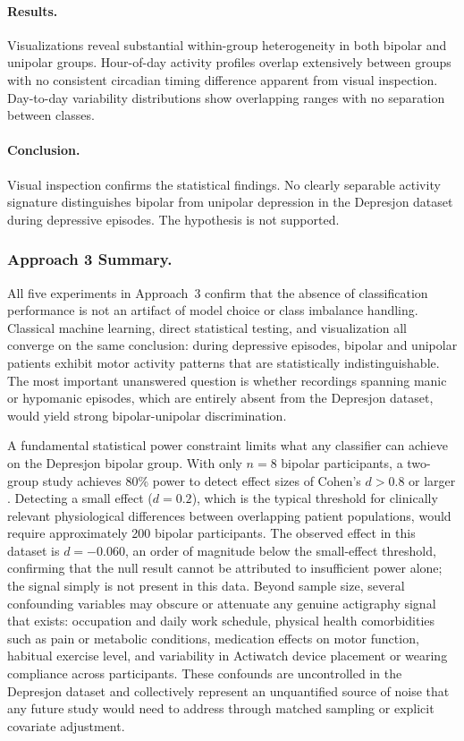 \paragraph{Results.}
Visualizations reveal substantial within-group heterogeneity in both bipolar and unipolar groups. Hour-of-day activity profiles overlap extensively between groups with no consistent circadian timing difference apparent from visual inspection. Day-to-day variability distributions show overlapping ranges with no separation between classes.

\paragraph{Conclusion.}
Visual inspection confirms the statistical findings. No clearly separable activity signature distinguishes bipolar from unipolar depression in the Depresjon dataset during depressive episodes. The hypothesis is not supported.

\subsubsection*{Approach 3 Summary.}
All five experiments in Approach~3 confirm that the absence of classification performance is not an artifact of model choice or class imbalance handling. Classical machine learning, direct statistical testing, and visualization all converge on the same conclusion: during depressive episodes, bipolar and unipolar patients exhibit motor activity patterns that are statistically indistinguishable. The most important unanswered question is whether recordings spanning manic or hypomanic episodes, which are entirely absent from the Depresjon dataset, would yield strong bipolar-unipolar discrimination.

A fundamental statistical power constraint limits what any classifier can achieve on the Depresjon bipolar group. With only $n = 8$ bipolar participants, a two-group study achieves 80\% power to detect effect sizes of Cohen's $d > 0.8$ or larger \cite{cohen1988statistical}. Detecting a small effect ($d = 0.2$), which is the typical threshold for clinically relevant physiological differences between overlapping patient populations, would require approximately 200 bipolar participants. The observed effect in this dataset is $d = {-}0.060$, an order of magnitude below the small-effect threshold, confirming that the null result cannot be attributed to insufficient power alone; the signal simply is not present in this data. Beyond sample size, several confounding variables may obscure or attenuate any genuine actigraphy signal that exists: occupation and daily work schedule, physical health comorbidities such as pain or metabolic conditions, medication effects on motor function, habitual exercise level, and variability in Actiwatch device placement or wearing compliance across participants. These confounds are uncontrolled in the Depresjon dataset and collectively represent an unquantified source of noise that any future study would need to address through matched sampling or explicit covariate adjustment.

